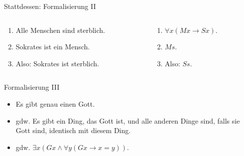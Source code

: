\documentclass[12pt]{beamer}
\begin{document}
\begin{frame}{Stattdessen: Formalisierung II}
  
  \begin{columns}

    \begin{column}[t]{5cm}
      \begin{enumerate}
      \item<1-> Alle Menschen sind sterblich.
      \item<1-> Sokrates ist ein Mensch.
      \item<1-> Also: Sokrates ist sterblich.
      \end{enumerate}
    \end{column}

    \begin{column}[t]{5cm}
      \begin{enumerate}
      \item<2-> $\forall x (Mx \to Sx)$.
      \item<3-> $Ms$.
      \item<4-> Also: $Ss$.
      \end{enumerate}
    \end{column}

  \end{columns}

\end{frame}

\begin{frame}{Formalisierung III}
  \begin{itemize}
  \item<1-> Es gibt genau einen Gott.
  \item<2-> gdw. Es gibt ein Ding, das Gott ist, und alle anderen
    Dinge sind, falls sie Gott sind, identisch mit diesem Ding.
  \item<3-> gdw. $\exists x(Gx \land \forall y(Gx \to x=y))$.
  \end{itemize}
\end{frame}
\end{document}
